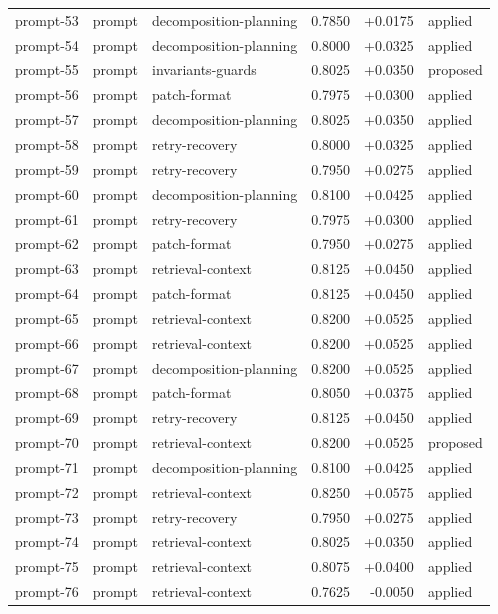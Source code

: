\begin{center}
\begin{longtable}{llp{5.2cm}rrl}
prompt-53 & prompt & decomposition-planning & 0.7850 & +0.0175 & applied \\
prompt-54 & prompt & decomposition-planning & 0.8000 & +0.0325 & applied \\
prompt-55 & prompt & invariants-guards & 0.8025 & +0.0350 & proposed \\
prompt-56 & prompt & patch-format & 0.7975 & +0.0300 & applied \\
prompt-57 & prompt & decomposition-planning & 0.8025 & +0.0350 & applied \\
prompt-58 & prompt & retry-recovery & 0.8000 & +0.0325 & applied \\
prompt-59 & prompt & retry-recovery & 0.7950 & +0.0275 & applied \\
prompt-60 & prompt & decomposition-planning & 0.8100 & +0.0425 & applied \\
prompt-61 & prompt & retry-recovery & 0.7975 & +0.0300 & applied \\
prompt-62 & prompt & patch-format & 0.7950 & +0.0275 & applied \\
prompt-63 & prompt & retrieval-context & 0.8125 & +0.0450 & applied \\
prompt-64 & prompt & patch-format & 0.8125 & +0.0450 & applied \\
prompt-65 & prompt & retrieval-context & 0.8200 & +0.0525 & applied \\
prompt-66 & prompt & retrieval-context & 0.8200 & +0.0525 & applied \\
prompt-67 & prompt & decomposition-planning & 0.8200 & +0.0525 & applied \\
prompt-68 & prompt & patch-format & 0.8050 & +0.0375 & applied \\
prompt-69 & prompt & retry-recovery & 0.8125 & +0.0450 & applied \\
prompt-70 & prompt & retrieval-context & 0.8200 & +0.0525 & proposed \\
prompt-71 & prompt & decomposition-planning & 0.8100 & +0.0425 & applied \\
prompt-72 & prompt & retrieval-context & 0.8250 & +0.0575 & applied \\
prompt-73 & prompt & retry-recovery & 0.7950 & +0.0275 & applied \\
prompt-74 & prompt & retrieval-context & 0.8025 & +0.0350 & applied \\
prompt-75 & prompt & retrieval-context & 0.8075 & +0.0400 & applied \\
prompt-76 & prompt & retrieval-context & 0.7625 & -0.0050 & applied \\

\end{longtable}
\end{center}
